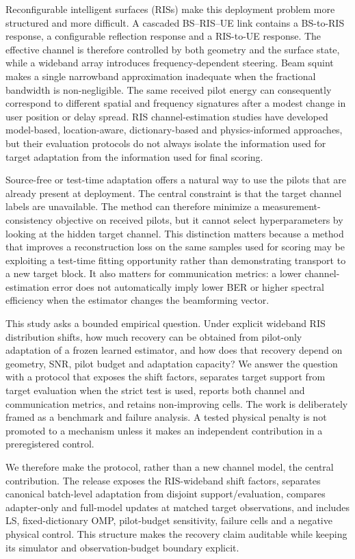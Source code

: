 \documentclass[10pt,twocolumn]{article}
\begin{document}
Reconfigurable intelligent surfaces (RISs) make this deployment problem more structured and more difficult. A cascaded BS--RIS--UE link contains a BS-to-RIS response, a configurable reflection response and a RIS-to-UE response. The effective channel is therefore controlled by both geometry and the surface state, while a wideband array introduces frequency-dependent steering. Beam squint makes a single narrowband approximation inadequate when the fractional bandwidth is non-negligible. The same received pilot energy can consequently correspond to different spatial and frequency signatures after a modest change in user position or delay spread. RIS channel-estimation studies have developed model-based, location-aware, dictionary-based and physics-informed approaches, but their evaluation protocols do not always isolate the information used for target adaptation from the information used for final scoring.

Source-free or test-time adaptation offers a natural way to use the pilots that are already present at deployment. The central constraint is that the target channel labels are unavailable. The method can therefore minimize a measurement-consistency objective on received pilots, but it cannot select hyperparameters by looking at the hidden target channel. This distinction matters because a method that improves a reconstruction loss on the same samples used for scoring may be exploiting a test-time fitting opportunity rather than demonstrating transport to a new target block. It also matters for communication metrics: a lower channel-estimation error does not automatically imply lower BER or higher spectral efficiency when the estimator changes the beamforming vector.

This study asks a bounded empirical question. Under explicit wideband RIS distribution shifts, how much recovery can be obtained from pilot-only adaptation of a frozen learned estimator, and how does that recovery depend on geometry, SNR, pilot budget and adaptation capacity? We answer the question with a protocol that exposes the shift factors, separates target support from target evaluation when the strict test is used, reports both channel and communication metrics, and retains non-improving cells. The work is deliberately framed as a benchmark and failure analysis. A tested physical penalty is not promoted to a mechanism unless it makes an independent contribution in a preregistered control.

We therefore make the protocol, rather than a new channel model, the central contribution. The release exposes the RIS-wideband shift factors, separates canonical batch-level adaptation from disjoint support/evaluation, compares adapter-only and full-model updates at matched target observations, and includes LS, fixed-dictionary OMP, pilot-budget sensitivity, failure cells and a negative physical control. This structure makes the recovery claim auditable while keeping its simulator and observation-budget boundary explicit.
\end{document}
